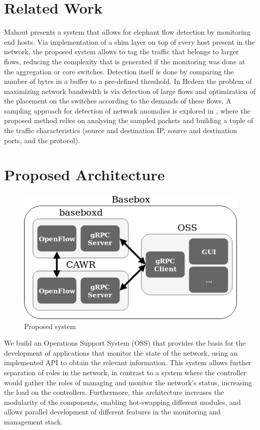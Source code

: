 \documentclass[a4paper]{IEEEtran}
\begin{document}
\section{Related Work}

\par Mahout \cite{curtis_mahout:_2011} presents a system that allows for elephant flow detection by monitoring end hosts. Via implementation of a shim layer on top 
of every host present in the network, the proposed system allows to tag the traffic that belongs to larger flows, reducing the complexity that is generated if the 
monitoring was done at the aggregation or core switches. Detection itself is done by comparing the number of bytes in a buffer to a pre-defined threshold. In
Hedera \cite{al-fares_hedera:_2010} the problem of maximizing network bandwidth is via detection of large flows and optimization of the placement on the switches
according to the demands of these flows. A sampling approach for detection of network anomalies is explored in \cite{jun_ddos_2014}, where the proposed method 
relies on analysing the sampled packets and building a tuple of the traffic characteristics (source and destination IP, source and destination ports, and the 
protocol).

\section{Proposed Architecture}

\begin{figure}
    \includegraphics[scale=0.4]{../doc/figures/bisdn/prp_system_low_level}
    \caption{Proposed system}
    \label{fig:fig}
\end{figure}

\par We build an Operations Support System (OSS) that provides the basis for the development of applications that monitor the state of the network, using an
implemented API to obtain the relevant information. This system allows further separation of roles in the network, in contrast to a system where the controller would
gather the roles of managing and monitor the network’s status, increasing the load on the controllers. Furthermore, this architecture increases the modularity of 
the components, enabling hot-swapping different modules, and allows parallel development of different features in the monitoring and management stack.
\end{document}
